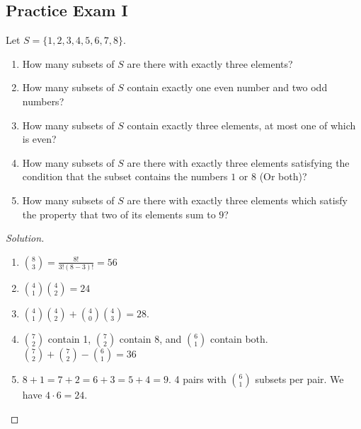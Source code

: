         \subsection{Practice Exam I}
        \begin{problem}
            Let $S = \{1,2,3,4,5,6,7,8\}$.
            \begin{enumerate}
                \item   How many subsets of $S$ are there with exactly three
                        elements?
                \item   How many subsets of $S$ contain exactly one even number
                        and two odd numbers?
                \item   How many subsets of $S$ contain exactly three elements,
                        at most one of which is even?
                \item   How many subsets of $S$ are there with exactly three
                        elements satisfying the condition that the subset
                        contains the numbers $1$ or $8$ (Or both)?
                \item   How many subsets of $S$ are there with exactly three
                        elements which satisfy the property that two of its
                        elements sum to $9$?
            \end{enumerate}
        \end{problem}
        \begin{proof}[Solution]
            \par
            \begin{enumerate}
                \item   $\binom{8}{3}=\frac{8!}{3!(8-3)!}=56$
                \item   $\binom{4}{1}\binom{4}{2}=24$
                \item   $\binom{4}{1}\binom{4}{2}+\binom{4}{0}\binom{4}{3}=28$.
                \item   $\binom{7}{2}$ contain 1, $\binom{7}{2}$ contain 8, and
                        $\binom{6}{1}$ contain both.
                        $\binom{7}{2}+\binom{7}{2}-\binom{6}{1}=36$
                \item   $8+1=7+2=6+3=5+4=9$. 4 pairs with $\binom{6}{1}$ subsets
                        per pair. We have $4\cdot 6 = 24$.
            \end{enumerate}
        \end{proof}
